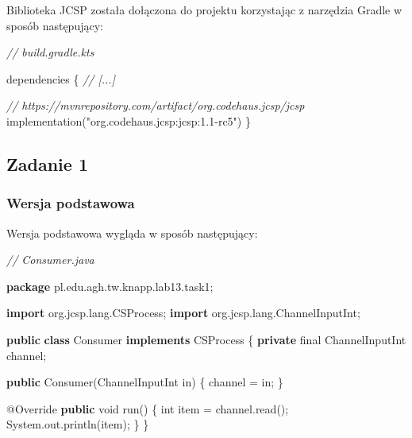 \documentclass[11pt]{article}
\newenvironment{Shaded}{}{}
\newcommand{\KeywordTok}[1]{\textcolor[rgb]{0.00,0.44,0.13}{\textbf{{#1}}}}
\newcommand{\DataTypeTok}[1]{\textcolor[rgb]{0.56,0.13,0.00}{{#1}}}
\newcommand{\StringTok}[1]{\textcolor[rgb]{0.25,0.44,0.63}{{#1}}}
\newcommand{\CommentTok}[1]{\textcolor[rgb]{0.38,0.63,0.69}{\textit{{#1}}}}
\newcommand{\FunctionTok}[1]{\textcolor[rgb]{0.02,0.16,0.49}{{#1}}}
\newcommand{\NormalTok}[1]{{#1}}
\newcommand{\ImportTok}[1]{{#1}}
\newcommand{\OperatorTok}[1]{\textcolor[rgb]{0.40,0.40,0.40}{{#1}}}
\newcommand{\BuiltInTok}[1]{{#1}}
\newcommand{\AttributeTok}[1]{\textcolor[rgb]{0.49,0.56,0.16}{{#1}}}
\begin{document}
    Biblioteka JCSP została dołączona do projektu korzystając z narzędzia
Gradle w sposób następujący:

\begin{Shaded}
\begin{Highlighting}[]
\CommentTok{// build.gradle.kts}

\NormalTok{dependencies }\OperatorTok{\{}
    \CommentTok{// [...]}

    \CommentTok{// https://mvnrepository.com/artifact/org.codehaus.jcsp/jcsp}
\NormalTok{    implementation}\OperatorTok{(}\StringTok{"org.codehaus.jcsp:jcsp:1.1{-}rc5"}\OperatorTok{)}
\OperatorTok{\}}
\end{Highlighting}
\end{Shaded}

    \hypertarget{zadanie-1}{%
\subsection{Zadanie 1}\label{zadanie-1}}

    \hypertarget{wersja-podstawowa}{%
\subsubsection{Wersja podstawowa}\label{wersja-podstawowa}}

Wersja podstawowa wygląda w sposób następujący:

    \begin{Shaded}
\begin{Highlighting}[]
\CommentTok{// Consumer.java}

\KeywordTok{package}\ImportTok{ pl}\OperatorTok{.}\ImportTok{edu}\OperatorTok{.}\ImportTok{agh}\OperatorTok{.}\ImportTok{tw}\OperatorTok{.}\ImportTok{knapp}\OperatorTok{.}\ImportTok{lab13}\OperatorTok{.}\ImportTok{task1}\OperatorTok{;}

\KeywordTok{import} \ImportTok{org}\OperatorTok{.}\ImportTok{jcsp}\OperatorTok{.}\ImportTok{lang}\OperatorTok{.}\ImportTok{CSProcess}\OperatorTok{;}
\KeywordTok{import} \ImportTok{org}\OperatorTok{.}\ImportTok{jcsp}\OperatorTok{.}\ImportTok{lang}\OperatorTok{.}\ImportTok{ChannelInputInt}\OperatorTok{;}

\KeywordTok{public} \KeywordTok{class}\NormalTok{ Consumer }\KeywordTok{implements}\NormalTok{ CSProcess }\OperatorTok{\{}
    \KeywordTok{private} \DataTypeTok{final}\NormalTok{ ChannelInputInt channel}\OperatorTok{;}

    \KeywordTok{public} \FunctionTok{Consumer}\OperatorTok{(}\NormalTok{ChannelInputInt in}\OperatorTok{)} \OperatorTok{\{}
\NormalTok{        channel }\OperatorTok{=}\NormalTok{ in}\OperatorTok{;}
    \OperatorTok{\}}

    \AttributeTok{@Override}
    \KeywordTok{public} \DataTypeTok{void} \FunctionTok{run}\OperatorTok{()} \OperatorTok{\{}
        \DataTypeTok{int}\NormalTok{ item }\OperatorTok{=}\NormalTok{ channel}\OperatorTok{.}\FunctionTok{read}\OperatorTok{();}
        \BuiltInTok{System}\OperatorTok{.}\FunctionTok{out}\OperatorTok{.}\FunctionTok{println}\OperatorTok{(}\NormalTok{item}\OperatorTok{);}
    \OperatorTok{\}}
\OperatorTok{\}}
\end{Highlighting}
\end{Shaded}
\end{document}
